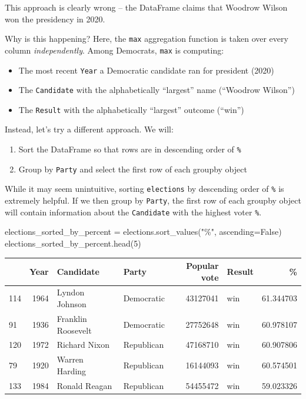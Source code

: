 \documentclass[
  letterpaper,
  DIV=11,
  numbers=noendperiod]{scrreprt}
\newenvironment{Shaded}{\begin{snugshade}}{\end{snugshade}}
\newcommand{\DecValTok}[1]{\textcolor[rgb]{0.68,0.00,0.00}{#1}}
\newcommand{\NormalTok}[1]{\textcolor[rgb]{0.00,0.23,0.31}{#1}}
\newcommand{\OperatorTok}[1]{\textcolor[rgb]{0.37,0.37,0.37}{#1}}
\newcommand{\StringTok}[1]{\textcolor[rgb]{0.13,0.47,0.30}{#1}}
\newcommand{\VariableTok}[1]{\textcolor[rgb]{0.07,0.07,0.07}{#1}}
\providecommand{\tightlist}{%
  \setlength{\itemsep}{0pt}\setlength{\parskip}{0pt}}\usepackage{longtable,booktabs,array}
\begin{document}
This approach is clearly wrong -- the DataFrame claims that Woodrow
Wilson won the presidency in 2020.

Why is this happening? Here, the \texttt{max} aggregation function is
taken over every column \emph{independently}. Among Democrats,
\texttt{max} is computing:

\begin{itemize}
\tightlist
\item
  The most recent \texttt{Year} a Democratic candidate ran for president
  (2020)
\item
  The \texttt{Candidate} with the alphabetically ``largest'' name
  (``Woodrow Wilson'')
\item
  The \texttt{Result} with the alphabetically ``largest'' outcome
  (``win'')
\end{itemize}

Instead, let's try a different approach. We will:

\begin{enumerate}
\def\labelenumi{\arabic{enumi}.}
\tightlist
\item
  Sort the DataFrame so that rows are in descending order of \texttt{\%}
\item
  Group by \texttt{Party} and select the first row of each groupby
  object
\end{enumerate}

While it may seem unintuitive, sorting \texttt{elections} by descending
order of \texttt{\%} is extremely helpful. If we then group by
\texttt{Party}, the first row of each groupby object will contain
information about the \texttt{Candidate} with the highest voter
\texttt{\%}.

\begin{Shaded}
\begin{Highlighting}[]
\NormalTok{elections\_sorted\_by\_percent }\OperatorTok{=}\NormalTok{ elections.sort\_values(}\StringTok{"\%"}\NormalTok{, ascending}\OperatorTok{=}\VariableTok{False}\NormalTok{)}
\NormalTok{elections\_sorted\_by\_percent.head(}\DecValTok{5}\NormalTok{)}
\end{Highlighting}
\end{Shaded}

\begin{tabular}{lrllrlr}
\toprule
{} &  Year &           Candidate &       Party &  Popular vote & Result &          \% \\
\midrule
114 &  1964 &      Lyndon Johnson &  Democratic &      43127041 &    win &  61.344703 \\
91  &  1936 &  Franklin Roosevelt &  Democratic &      27752648 &    win &  60.978107 \\
120 &  1972 &       Richard Nixon &  Republican &      47168710 &    win &  60.907806 \\
79  &  1920 &      Warren Harding &  Republican &      16144093 &    win &  60.574501 \\
133 &  1984 &       Ronald Reagan &  Republican &      54455472 &    win &  59.023326 \\
\bottomrule
\end{tabular}
\end{document}
